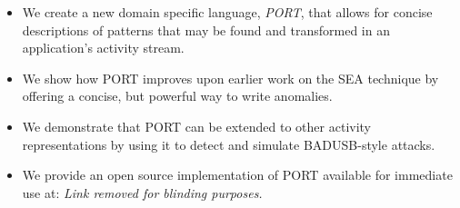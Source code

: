 \begin{itemize}

\item We create a new domain specific language, {\em PORT},
  that allows for concise descriptions of patterns
  that may be
  found and transformed in an application's activity stream.

\item We show how PORT improves upon earlier work on the SEA technique by offering a concise, but powerful way to write anomalies.

\item We demonstrate that PORT can be extended to other activity representations by using it to detect and simulate BADUSB-style attacks.

\item We provide an open source implementation of PORT available for immediate use
at: \textit{Link removed for blinding purposes.}

\end{itemize}


